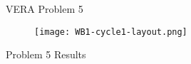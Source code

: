 
\begin{frame}[t]{VERA Problem 5}
    
    \begin{figure}[h]
      \centering
      \texttt{[image: WB1-cycle1-layout.png]}
    \end{figure}
    
\end{frame}


\begin{frame}[t]{Problem 5 Results}
    
    
    
\end{frame}